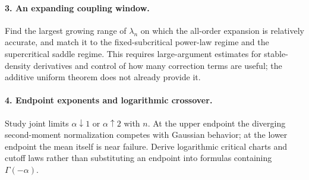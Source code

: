 \documentclass[11pt,a4paper]{article}
\numberwithin{equation}{section}
\theoremstyle{definition}
\theoremstyle{remark}
\begin{document}
\paragraph{3. An expanding coupling window.}
Find the largest growing range of $\lambda_n$ on which the all-order
expansion is relatively accurate, and match it to the fixed-subcritical
power-law regime and the supercritical saddle regime. This requires
large-argument estimates for stable-density derivatives and control of
how many correction terms are useful; the additive uniform theorem does
not already provide it.

\paragraph{4. Endpoint exponents and logarithmic crossover.}
Study joint limits $\alpha\downarrow1$ or $\alpha\uparrow2$ with $n$.
At the upper endpoint the diverging second-moment normalization competes
with Gaussian behavior; at the lower endpoint the mean itself is near
failure. Derive logarithmic critical charts and cutoff laws rather than
substituting an endpoint into formulas containing $\Gamma(-\alpha)$.
\end{document}
